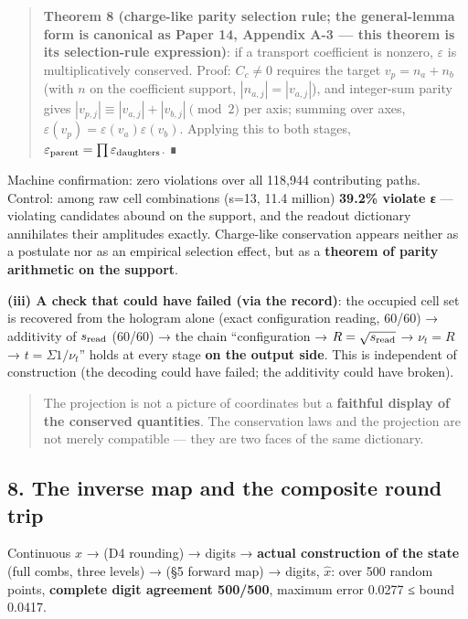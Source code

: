 \documentclass[
]{ltjsarticle}
\begin{document}
\begin{quote}
\textbf{Theorem 8 (charge-like parity selection rule; the general-lemma
form is canonical as Paper 14, Appendix A-3 --- this theorem is its
selection-rule expression)}: if a transport coefficient is nonzero,
\(\varepsilon\) is multiplicatively conserved. Proof: \(C_c\neq0\)
requires the target \(v_p=n_a+n_b\) (with \(n\) on the coefficient
support, \(|n_{a,j}|=|v_{a,j}|\)), and integer-sum parity gives
\(|v_{p,j}|\equiv|v_{a,j}|+|v_{b,j}|\pmod 2\) per axis; summing over
axes, \(\varepsilon(v_p)=\varepsilon(v_a)\varepsilon(v_b)\). Applying
this to both stages,
\(\varepsilon_{\rm parent}=\prod\varepsilon_{\rm daughters}\). ∎
\end{quote}

Machine confirmation: zero violations over all 118,944 contributing
paths. Control: among raw cell combinations (s=13, 11.4 million)
\textbf{39.2\% violate ε} --- violating candidates abound on the
support, and the readout dictionary annihilates their amplitudes
exactly. Charge-like conservation appears neither as a postulate nor as
an empirical selection effect, but as a \textbf{theorem of parity
arithmetic on the support}.

\textbf{(iii) A check that could have failed (via the record)}: the
occupied cell set is recovered from the hologram alone (exact
configuration reading, 60/60) → additivity of \(s_{\rm read}\) (60/60) →
the chain ``configuration → \(R=\sqrt{s_{\rm read}}\) → \(\nu_t=R\) →
\(t=\Sigma1/\nu_t\)'' holds at every stage \textbf{on the output side}.
This is independent of construction (the decoding could have failed; the
additivity could have broken).

\begin{quote}
The projection is not a picture of coordinates but a \textbf{faithful
display of the conserved quantities}. The conservation laws and the
projection are not merely compatible --- they are two faces of the same
dictionary.
\end{quote}

\subsection{8. The inverse map and the composite round
trip}\label{the-inverse-map-and-the-composite-round-trip}

Continuous \(x\) → (D4 rounding) → digits → \textbf{actual construction
of the state} (full combs, three levels) → (§5 forward map) → digits,
\(\hat x\): over 500 random points, \textbf{complete digit agreement
500/500}, maximum error 0.0277 ≤ bound 0.0417.
\end{document}
